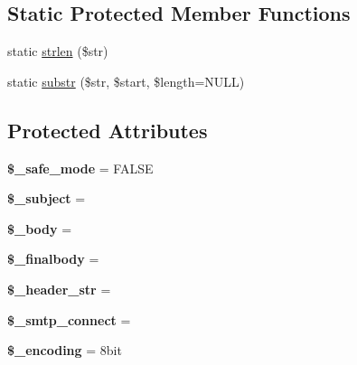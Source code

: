 \subsection*{Static Protected Member Functions}
\begin{DoxyCompactItemize}
\item 
static \mbox{\hyperlink{class_c_i___email_a97a496ca5086c4ff8e42453cb4df46f6}{strlen}} (\$str)
\item 
static \mbox{\hyperlink{class_c_i___email_a8e89566d4fe484c4fa47d2c6ce323a58}{substr}} (\$str, \$start, \$length=N\+U\+LL)
\end{DoxyCompactItemize}
\subsection*{Protected Attributes}
\begin{DoxyCompactItemize}
\item 
\mbox{\label{class_c_i___email_aaa685d7130ed9418bb96bb36d7d49fc6}} 
{\bfseries \$\+\_\+safe\+\_\+mode} = F\+A\+L\+SE
\item 
\mbox{\label{class_c_i___email_aa0a95e85242a69d21340cebb280ca3ba}} 
{\bfseries \$\+\_\+subject} = \textquotesingle{}\textquotesingle{}
\item 
\mbox{\label{class_c_i___email_adf433ed346dde004819664734d85096d}} 
{\bfseries \$\+\_\+body} = \textquotesingle{}\textquotesingle{}
\item 
\mbox{\label{class_c_i___email_a742f88dd5a1ad09b83c103b28d2d5d05}} 
{\bfseries \$\+\_\+finalbody} = \textquotesingle{}\textquotesingle{}
\item 
\mbox{\label{class_c_i___email_a42513a3ae7ca094e8a9c191308d9b20f}} 
{\bfseries \$\+\_\+header\+\_\+str} = \textquotesingle{}\textquotesingle{}
\item 
\mbox{\label{class_c_i___email_aaf68495ab30ed6299e327d077138f8e8}} 
{\bfseries \$\+\_\+smtp\+\_\+connect} = \textquotesingle{}\textquotesingle{}
\item 
\mbox{\label{class_c_i___email_abf3ec135af84eb837d0eaede0be3e08b}} 
{\bfseries \$\+\_\+encoding} = \textquotesingle{}8bit\textquotesingle{}

\end{DoxyCompactItemize}
